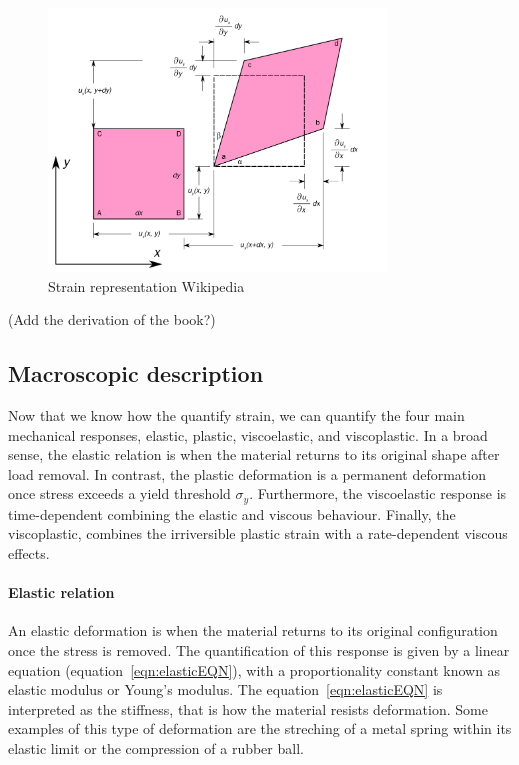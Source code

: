 \begin{figure}[ht!]
    \centering
    \includegraphics[width=0.8\textwidth]{figs/2D_geometric_strain.png}
    \caption{Strain representation Wikipedia}
\end{figure}

(Add the derivation of the book?)

\subsection{Macroscopic description}

Now that we know how the quantify strain, we can quantify the four main mechanical responses,
    elastic,
    plastic,
    viscoelastic,
    and viscoplastic.
In a broad sense, the elastic relation is when the material returns to its original shape after load removal.
In contrast, the plastic deformation is a permanent deformation once stress exceeds a yield threshold $\sigma_y$.
Furthermore, the viscoelastic response is time-dependent combining the elastic and viscous behaviour.
Finally, the viscoplastic, combines the irriversible plastic strain with a rate-dependent viscous effects.

\paragraph{Elastic relation} An elastic deformation is when the material returns to its original configuration once the stress is removed.
The quantification of this response is given by a linear equation (equation~\eqref{eqn:elasticEQN}),
with a proportionality constant known as elastic modulus or Young's modulus.
The equation~\eqref{eqn:elasticEQN} is interpreted as the stiffness, that is how the material resists deformation.
Some examples of this type of deformation are the streching of a metal spring within its elastic limit or the compression of a rubber ball.

